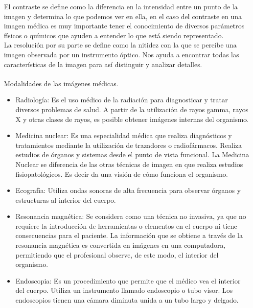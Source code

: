 \documentclass[12pt]{report}
\begin{document}
El contraste se define como la diferencia en la intensidad entre un punto de  la imagen y determina lo que podemos ver en ella, en el caso del contraste en una imagen médica es muy importante tener el conocimiento de diversos parámetros físicos o químicos que ayuden a entender lo que está siendo representado.\\

La resolución por su parte se define como la nitidez con la que se percibe una imagen observada por un instrumento óptico. Nos ayuda a encontrar todas las características de la imagen para así distinguir y analizar detalles.\cite{essen}\\ \\
Modalidades de las imágenes médicas.\cite{modim}\\
\begin{itemize}
\item Radiología: Es el uso médico de la radiación para diagnosticar y tratar diversos problemas de salud. A partir de la utilización de rayos gamma, rayos X y otras clases de rayos, es posible obtener imágenes internas del organismo.
\item Medicina nuclear: Es una especialidad médica que realiza diagnósticos y tratamientos mediante la utilización de trazadores o radiofármacos. Realiza estudios de órganos y sistemas desde el punto de vista funcional.  La Medicina Nuclear se diferencia de las otras técnicas de imagen en que realiza estudios fisiopatológicos. Es decir da una visión de cómo funciona el organismo.
\item Ecografía: Utiliza ondas sonoras de alta frecuencia para observar órganos y estructuras al interior del cuerpo.
\item Resonancia magnética: Se considera como una técnica no invasiva, ya que no requiere la introducción de herramientas o elementos en el cuerpo ni tiene consecuencias para el paciente. La información que se obtiene a través de la resonancia magnética es convertida en imágenes en una computadora, permitiendo que el profesional observe, de este modo, el interior del organismo.
\item Endoscopia: Es un procedimiento que permite que el médico vea el interior del cuerpo. Utiliza un instrumento llamado endoscopio o tubo visor. Los endoscopios tienen una cámara diminuta unida a un tubo largo y delgado.
\end{itemize}
\end{document}
